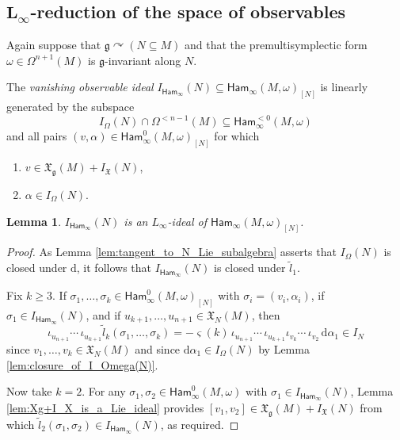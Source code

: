 \documentclass[pdftex]{sigma}
\numberwithin{equation}{section}
\newtheorem{Lemma}[Theorem]{Lemma}
\newcommand{\g}{\mathfrak{g}}
\newcommand{\Ham}{\mathsf{Ham}}
\newcommand{\fgmodule}{\mathfrak{X}_{\g}}
\newcommand{\tgtvanform}{I_{\Omega}(N)}
\newcommand{\vanvf}{I_{\mathfrak{X}}(N)}%
\newcommand{\X}{\mathfrak{X}}
\renewcommand{\subset}{\subseteq}
\renewcommand{\d}{\mathrm{d}}
\begin{document}
\subsection[L\_infty-reduction of the space of observables]{$\boldsymbol{L_\infty}$-reduction of the space of observables}%

Again suppose that $\g\curvearrowright(N\subset M)$ and that the premultisymplectic form $\omega\in\Omega^{n+1}(M)$ is $\g$-invariant along $N$.

\begin{Definition}\label{def:VanishIdeal}
	The \emph{vanishing observable ideal} $I_{\Ham_\infty}(N)\subset \Ham_\infty(M,\omega)_{[N]}$ is linearly generated by the subspace
	\[
		I_\Omega(N)\cap\Omega^{<n-1}(M) \subset \Ham_\infty^{<0}(M,\omega)
	\]
	and all pairs $(v,\alpha)\in\Ham_\infty^0(M,\omega)_{[N]}$ for which
	\begin{enumerate}\itemsep=0pt
		\item[(i)] $v\in \fgmodule(M) + \vanvf$,
		\item[(ii)] $\alpha\in I_\Omega(N)$.
	\end{enumerate}
\end{Definition}

\begin{Lemma}\label{lem:Ham_infty_is_an_L-infty_ideal}
	$I_{\Ham_\infty}(N)$ is an $L_\infty$-ideal of $\Ham_\infty(M,\omega)_{[N]}$.
\end{Lemma}

\begin{proof}
	As Lemma \ref{lem:tangent_to_N_Lie_subalgebra} asserts that $\tgtvanform$ is closed under $\d$, it follows that $I_{\Ham_\infty}(N)$ is closed under $\tilde{l}_1$.

	Fix $k\geq 3$. If $\sigma_1,\dots,\sigma_k\in \Ham_\infty^0(M,\omega)_{[N]}$ with $\sigma_i=(v_i,\alpha_i)$, if $\sigma_1\in I_{\Ham_\infty}(N)$, and if $u_{k+1},\dots,u_{n+1}\in\X_N(M)$, then
	\[
		\iota_{u_{n+1}}\!\cdots\,\iota_{u_{k+1}}\tilde{l}_k(\sigma_1,\dots,\sigma_k)
			= {-}\varsigma(k)\,\iota_{u_{n+1}}\!\cdots\,\iota_{u_{k+1}}\iota_{v_k}\!\cdots\,\iota_{v_2}\,\d\alpha_1 \in I_N
	\]
	since $v_1,\dots,v_k\in \X_N(M)$ and since $\d\alpha_1\in \tgtvanform$ by Lemma \ref{lem:closure_of_I_Omega(N)}.

	Now take $k=2$. For any $\sigma_1,\sigma_2\in \Ham_\infty^0(M,\omega)$ with $\sigma_1\in I_{\Ham_\infty}(N)$, Lemma \ref{lem:Xg+I_X_is_a_Lie_ideal} provides $[v_1,v_2]\in \X_\g(M) + I_\X(N)$ from which $\tilde{l}_2(\sigma_1,\sigma_2)\in I_{\Ham_\infty}(N)$, as required.
\end{proof}
\end{document}
